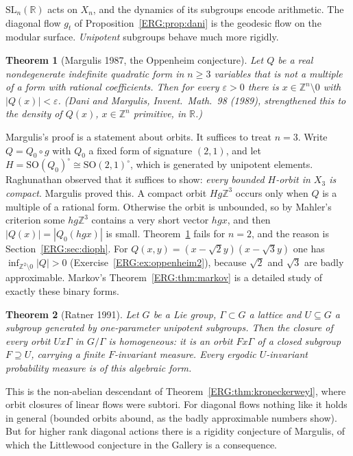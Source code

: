 \documentclass[11pt,openany]{book}
\theoremstyle{plain}
\newtheorem{theorem}{Theorem}[chapter]
\theoremstyle{definition}
\theoremstyle{remark}
\newcommand{\R}{\mathbb{R}}
\newcommand{\Z}{\mathbb{Z}}
\newcommand{\SL}{\mathrm{SL}}
\newcommand{\SO}{\mathrm{SO}}
\newcommand{\abs}[1]{\left\lvert #1 \right\rvert}
\begin{document}
$\SL_n(\R)$ acts on $X_n$, and the dynamics of its subgroups encode arithmetic. The diagonal flow
$g_t$ of Proposition~\ref{ERG:prop:dani} is the geodesic flow on the modular surface. \emph{Unipotent}
subgroups behave much more rigidly.

\begin{theorem}[Margulis 1987, the Oppenheim conjecture]\label{ERG:thm:margulis}
Let $Q$ be a real nondegenerate indefinite quadratic form in $n\ge3$ variables that is not a multiple of a
form with rational coefficients. Then for every $\varepsilon>0$ there is $x\in\Z^n\setminus0$ with
$\abs{Q(x)}<\varepsilon$. (Dani and Margulis, \emph{Invent.\ Math.}~98 (1989), strengthened this to the
density of $Q(x)$, $x\in\Z^n$ primitive, in $\R$.)
\end{theorem}

Margulis's proof is a statement about orbits. It suffices to treat $n=3$. Write $Q=Q_0\circ g$ with
$Q_0$ a fixed form of signature $(2,1)$, and let $H=\SO(Q_0)^\circ\cong\SO(2,1)^\circ$, which is generated by
unipotent elements. Raghunathan observed that it suffices to show: \emph{every bounded $H$-orbit in $X_3$ is
compact}. Margulis proved this. A compact orbit $Hg\Z^3$ occurs only when $Q$ is a multiple of a rational
form. Otherwise the orbit is unbounded, so by Mahler's criterion some $hg\Z^3$ contains a very short vector
$hgx$, and then $\abs{Q(x)}=\abs{Q_0(hgx)}$ is small. Theorem~\ref{ERG:thm:margulis} fails for $n=2$, and the
reason is Section~\ref{ERG:sec:dioph}. For $Q(x,y)=(x-\sqrt2y)(x-\sqrt3y)$ one has
$\inf_{\Z^2\setminus0}\abs{Q}>0$ (Exercise~\ref{ERG:ex:oppenheim2}), because $\sqrt2$ and $\sqrt3$ are badly
approximable. Markov's Theorem~\ref{ERG:thm:markov} is a detailed study of exactly these binary forms.

\begin{theorem}[Ratner 1991]\label{ERG:thm:ratner}
Let $G$ be a Lie group, $\Gamma\subset G$ a lattice and $U\subseteq G$ a subgroup generated by
one-parameter unipotent subgroups. Then the closure of every orbit $Ux\Gamma$ in $G/\Gamma$ is
\emph{homogeneous}: it is an orbit $Fx\Gamma$ of a closed subgroup $F\supseteq U$, carrying a finite
$F$-invariant measure. Every ergodic $U$-invariant probability measure is of this algebraic form.
\end{theorem}

This is the non-abelian descendant of Theorem~\ref{ERG:thm:kroneckerweyl}, where orbit closures of linear
flows were subtori. For diagonal flows nothing like it holds in general (bounded orbits abound, as the
badly approximable numbers show). But for higher rank diagonal actions there is a rigidity conjecture of
Margulis, of which the Littlewood conjecture in the Gallery is a consequence.
\end{document}

